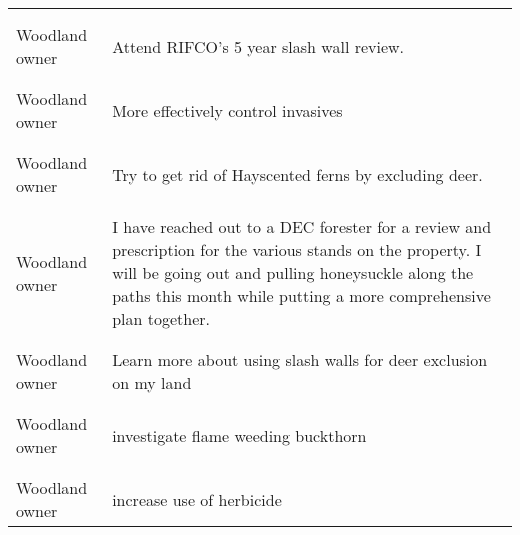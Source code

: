 \documentclass[
]{article}
\begin{document}
\begin{longtable}[t]{l>{\raggedright\arraybackslash}p{10cm}}
\midrule\\
\cellcolor{gray!10}{Woodland owner} & \cellcolor{gray!10}{Increase selective removal of invasives in my relatively small woodlot; barberry, multiflora, bittersweet, especially; stiltgrass on borders}\\
\midrule
Woodland owner & Attend RIFCO's 5 year slash wall review.\\
\midrule\\
\cellcolor{gray!10}{Woodland owner} & \cellcolor{gray!10}{I won't plant any trees until I can build deer exclusion areas!}\\
\midrule
\addlinespace
Woodland owner & More effectively control invasives\\
\midrule\\
\cellcolor{gray!10}{Woodland owner} & \cellcolor{gray!10}{Evaluate several woodlots for the potential benefit of change.}\\
\midrule
Woodland owner & Try to get rid of Hayscented ferns  by excluding deer.\\
\midrule\\
\cellcolor{gray!10}{Woodland owner} & \cellcolor{gray!10}{plant and protect higher grade trees with fencing which I do now when planting trees on our property.}\\
\midrule
Woodland owner & I have reached out to a DEC forester for a review and prescription for the various stands on the property. I will be going out and pulling honeysuckle along the paths this month while putting a more comprehensive plan together.\\
\midrule\\
\addlinespace
\cellcolor{gray!10}{Woodland owner} & \cellcolor{gray!10}{kill ferns and plant protected trees.  Can't do much to control deer, regrettably.}\\
\midrule
Woodland owner & Learn more about using slash walls for deer exclusion on my land\\
\midrule\\
\cellcolor{gray!10}{Woodland owner} & \cellcolor{gray!10}{more intensively consider deer exclosure fencing for an area of our forest}\\
\midrule
Woodland owner & investigate flame weeding buckthorn\\
\midrule\\
\cellcolor{gray!10}{Woodland owner} & \cellcolor{gray!10}{Treat invasive plants with herbicides}\\
\midrule
\addlinespace
Woodland owner & increase use of herbicide\\

\end{longtable}
\end{document}
